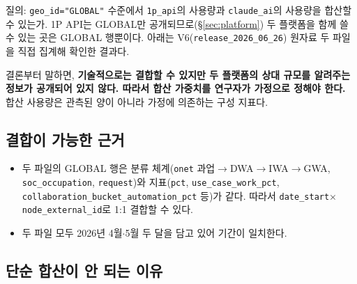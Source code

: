 \documentclass[11pt]{article}
\begin{document}
질의: \texttt{geo\_id="GLOBAL"} 수준에서 \texttt{1p\_api}의 사용량과 \texttt{claude\_ai}의 사용량을 합산할 수 있는가. 1P API는 GLOBAL만 공개되므로(\S\ref{sec:platform}) 두 플랫폼을 함께 쓸 수 있는 곳은 GLOBAL 행뿐이다. 아래는 V6(\texttt{release\_2026\_06\_26}) 원자료 두 파일을 직접 집계해 확인한 결과다.

결론부터 말하면, \textbf{기술적으로는 결합할 수 있지만 두 플랫폼의 상대 규모를 알려주는 정보가 공개되어 있지 않다. 따라서 합산 가중치를 연구자가 가정으로 정해야 한다.} 합산 사용량은 관측된 양이 아니라 가정에 의존하는 구성 지표다.

\subsection{결합이 가능한 근거}

\begin{itemize}
  \item 두 파일의 GLOBAL 행은 분류 체계(\texttt{onet} 과업$\to$DWA$\to$IWA$\to$GWA, \texttt{soc\_occupation}, \texttt{request})와 지표(\texttt{pct}, \texttt{use\_case\_work\_pct}, \texttt{collaboration\_bucket\_automation\_pct} 등)가 같다. 따라서 \texttt{date\_start}$\times$\texttt{node\_external\_id}로 1:1 결합할 수 있다.
  \item 두 파일 모두 2026년 4월$\cdot$5월 두 달을 담고 있어 기간이 일치한다.
\end{itemize}

\subsection{단순 합산이 안 되는 이유}
\end{document}
